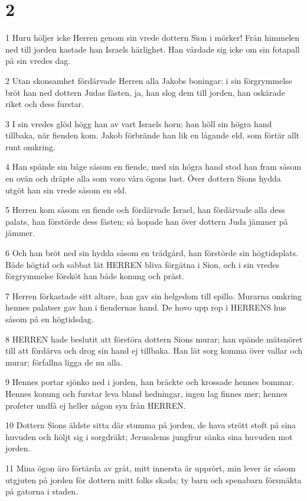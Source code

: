 \chapter{2}

\par 1 Huru höljer icke Herren genom sin vrede dottern Sion i mörker! Från himmelen ned till jorden kastade han Israels härlighet. Han vårdade sig icke om sin fotapall på sin vredes dag.
\par 2 Utan skonsamhet fördärvade Herren alla Jakobs boningar; i sin förgrymmelse bröt han ned dottern Judas fästen, ja, han slog dem till jorden, han oskärade riket och dess furstar.
\par 3 I sin vredes glöd högg han av vart Israels horn; han höll sin högra hand tillbaka, när fienden kom. Jakob förbrände han lik en lågande eld, som förtär allt runt omkring.
\par 4 Han spände sin båge såsom en fiende, med sin högra hand stod han fram såsom en ovän och dräpte alla som voro våra ögons lust. Över dottern Sions hydda utgöt han sin vrede såsom en eld.
\par 5 Herren kom såsom en fiende och fördärvade Israel, han fördärvade alla dess palats, han förstörde dess fästen; så hopade han över dottern Juda jämmer på jämmer.
\par 6 Och han bröt ned sin hydda såsom en trädgård, han förstörde sin högtidsplats. Både högtid och sabbat lät HERREN bliva förgätna i Sion, och i sin vredes förgrymmelse försköt han både konung och präst.
\par 7 Herren förkastade sitt altare, han gav sin helgedom till spillo. Murarna omkring hennes palatser gav han i fiendernas hand. De hovo upp rop i HERRENS hus såsom på en högtidsdag.
\par 8 HERREN hade beslutit att förstöra dottern Sions murar; han spände mätsnöret till att fördärva och drog sin hand ej tillbaka. Han lät sorg komma över vallar och murar; förfallna ligga de nu alla.
\par 9 Hennes portar sjönko ned i jorden, han bräckte och krossade hennes bommar. Hennes konung och furstar leva bland hedningar, ingen lag finnes mer; hennes profeter undfå ej heller någon syn från HERREN.
\par 10 Dottern Sions äldste sitta där stumma på jorden, de hava strött stoft på sina huvuden och höljt sig i sorgdräkt; Jerusalems jungfrur sänka sina huvuden mot jorden.
\par 11 Mina ögon äro förtärda av gråt, mitt innersta är upprört, min lever är såsom utgjuten på jorden för dottern mitt folks skada; ty barn och spenabarn försmäkta på gatorna i staden.

